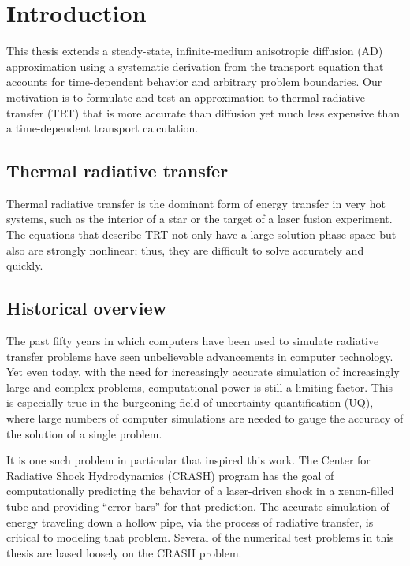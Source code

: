 
\chapter{Introduction}\label{chap:introduction}

This thesis extends a steady-state, infinite-medium anisotropic diffusion (AD)
approximation \cite{Mor2007,Lar2009c} using a systematic derivation from the
transport equation that accounts for time-dependent behavior and arbitrary
problem boundaries. Our motivation is to formulate and test an approximation to
thermal radiative transfer (TRT) that is more accurate than diffusion yet much
less expensive than a time-dependent transport calculation.

\section{Thermal radiative transfer}


Thermal radiative transfer is the dominant form of energy transfer in very
hot systems, such as the interior of a star or the target of a laser fusion
experiment. The equations that describe TRT not only have a large solution
phase space but also are strongly nonlinear; thus, they are difficult to solve
accurately and quickly.

\section{Historical overview}

The past fifty years in which computers have been used to simulate radiative
transfer problems \cite{Cam1964,Cam1969} have seen unbelievable
advancements in computer technology.
Yet even today, with the need for increasingly accurate simulation of
increasingly
large and complex problems, computational power is still a limiting factor.
This is especially true in the burgeoning field of uncertainty quantification
(UQ), where large numbers of computer simulations are needed to gauge the
accuracy of the solution of a single problem.

It is one such problem in particular that inspired this work. The Center for
Radiative Shock Hydrodynamics (CRASH) program \cite{Crash2010} has the goal of
computationally predicting the behavior of a laser-driven shock in a
xenon-filled tube and providing ``error bars'' for that prediction. The accurate
simulation of energy traveling down a hollow pipe, via the process of
radiative transfer, is critical to modeling that problem. Several of the
numerical test problems in this thesis are based loosely on the CRASH problem.

